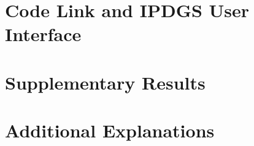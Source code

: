 \documentclass[12pt,twoside]{report}
\begin{document}
\chapter{Code Link and IPDGS User Interface}


\chapter{Supplementary Results}


\chapter{Additional Explanations}



\renewcommand\harvardurl{\textbf{URL:} \url}

\end{document}

